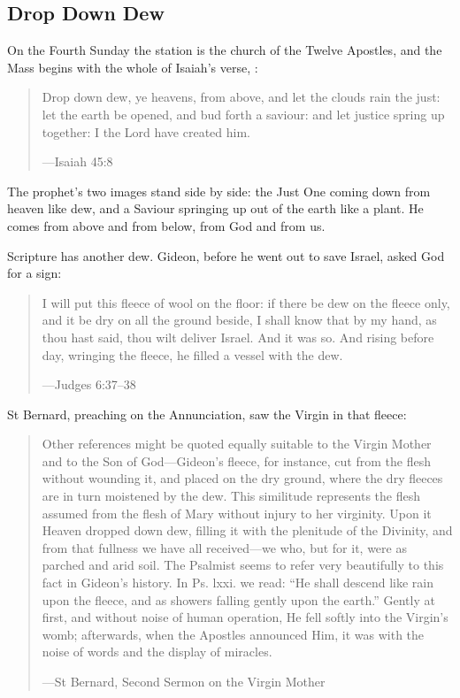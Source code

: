 \subsection{Drop Down Dew}\label{sec:fourth-week}

On the Fourth Sunday the station is the church of the Twelve Apostles, and the
Mass begins with the whole of Isaiah's verse, :

\begin{quote}
Drop down dew, ye heavens, from above, and let the clouds rain the just: let
the earth be opened, and bud forth a saviour: and let justice spring up
together: I the Lord have created him.\par
{\smallskip\noindent\small ---Isaiah 45:8\par}
\end{quote}

The prophet's two images stand side by side: the Just One coming down from heaven like dew, and a Saviour springing up out of
the earth like a plant. He comes from above and from below, from God and from
us.

Scripture has another dew. Gideon, before he
went out to save Israel, asked God for a sign:

\begin{quote}
I will put this fleece of wool on the floor: if there be dew on the fleece
only, and it be dry on all the ground beside, I shall know that by my hand, as
thou hast said, thou wilt deliver Israel. And it was so. And rising before day,
wringing the fleece, he filled a vessel with the dew.\par
{\smallskip\noindent\small ---Judges 6:37--38\par}
\end{quote}

St Bernard, preaching on the Annunciation, saw the Virgin in that fleece:

\begin{quote}
Other references might be quoted equally suitable to the Virgin Mother and to
the Son of God---Gideon's fleece, for instance, cut from the flesh without
wounding it, and placed on the dry ground, where the dry fleeces are in turn
moistened by the dew. This similitude represents the flesh assumed from the
flesh of Mary without injury to her virginity. Upon it Heaven dropped down dew,
filling it with the plenitude of the Divinity, and from that fullness we have
all received---we who, but for it, were as parched and arid soil. The Psalmist
seems to refer very beautifully to this fact in Gideon's history. In Ps. lxxi.
we read: ``He shall descend like rain upon the fleece, and as showers falling
gently upon the earth.'' Gently at first, and without noise of human operation,
He fell softly into the Virgin's womb; afterwards, when the Apostles announced
Him, it was with the noise of words and the display of miracles.\par
{\smallskip\noindent\small ---St Bernard, Second Sermon on the Virgin Mother\par}
\end{quote}

